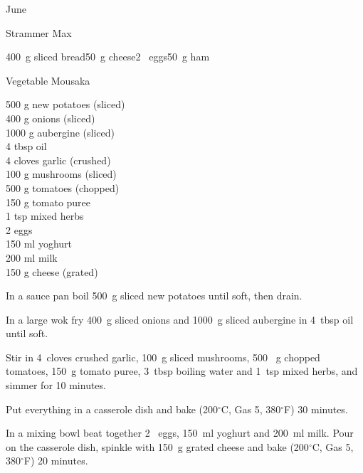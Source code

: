 \begin{menu}{June}
\begin{recipe}{1}{Strammer Max}
    \begin{instructions}
    \item 400~g sliced bread50~g  cheese2~  eggs50~g  ham
    \end{instructions}
    \end{recipe}%
  
    \begin{recipe}{2}{Vegetable Mousaka}%
		\begin{ingredients}
		500 g new potatoes (sliced) \\
	400 g onions (sliced) \\
	1000 g aubergine (sliced) \\
	4 tbsp oil  \\
	4 cloves garlic (crushed) \\
	100 g mushrooms (sliced) \\
	500  g tomatoes (chopped) \\
	150 g tomato puree  \\
	1 tsp mixed herbs  \\
	2  eggs  \\
	150 ml yoghurt  \\
	200 ml milk  \\
	150 g cheese (grated) \\
	
		\end{ingredients}
	
    \begin{instructions}
    \item 
        In a sauce pan boil
        500~g sliced new potatoes
        until soft,
        then drain.
      \item 
        In a large wok fry
        400~g sliced onions
        and
        1000~g sliced aubergine
        in
        4~tbsp  oil
        until soft.
      \item 
        Stir in
        4~cloves crushed garlic,
        100~g sliced mushrooms,
        500 ~g chopped tomatoes,
        150~g  tomato puree,
        3~tbsp  boiling water
        and
        1~tsp  mixed herbs,
        and simmer for 10 minutes.
      \item 
        Put everything in a casserole dish
        and bake (200$^{\circ}$C, Gas 5, 380$^{\circ}$F) 30 minutes.
      \item 
        In a mixing bowl beat together
        2~  eggs,
        150~ml  yoghurt
        and
        200~ml  milk.
        Pour on the casserole dish, spinkle with
        150~g grated cheese
        and bake (200$^{\circ}$C, Gas 5, 380$^{\circ}$F) 20 minutes.
      
    \end{instructions}
    \end{recipe}%
  
    \clearpage
    \end{menu}
	
